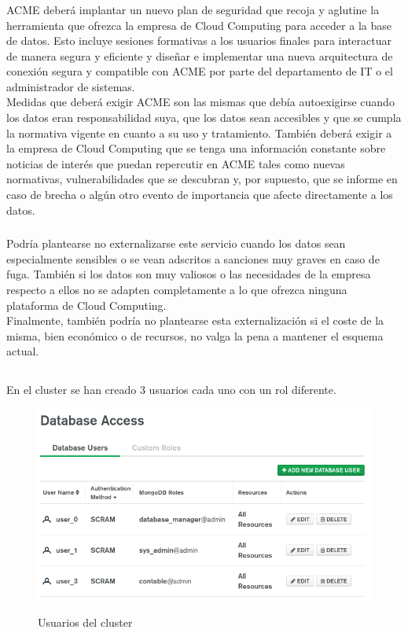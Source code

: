 \documentclass[10pt,a4paper]{article}
\begin{document}
\subsubsection{}
ACME deberá implantar un nuevo plan de seguridad que recoja y aglutine la herramienta que ofrezca la empresa de Cloud Computing para acceder a la base de datos. Esto incluye sesiones formativas a los usuarios finales para interactuar de manera segura y eficiente y diseñar e implementar una nueva arquitectura de conexión segura y compatible con ACME por parte del departamento de IT o el administrador de sistemas.\\
Medidas que deberá exigir ACME son las mismas que debía autoexigirse cuando los datos eran responsabilidad suya, que los datos sean accesibles y que se cumpla la normativa vigente en cuanto a su uso y tratamiento. También deberá exigir a la empresa de Cloud Computing que se tenga una información constante sobre noticias de interés que puedan repercutir en ACME tales como nuevas normativas, vulnerabilidades que se descubran y, por supuesto, que se informe en caso de brecha o algún otro evento de importancia que afecte directamente a los datos.

\subsubsection{}
Podría plantearse no externalizarse este servicio cuando los datos sean especialmente sensibles o se vean adscritos a sanciones muy graves en caso de fuga. También si los datos son muy valiosos o las necesidades de la empresa respecto a ellos no se adapten completamente a lo que ofrezca ninguna plataforma de Cloud Computing.\\
Finalmente, también podría no plantearse esta externalización si el coste de la misma, bien económico o de recursos, no valga la pena a mantener el esquema actual.

\subsection{}

En el cluster se han creado 3 usuarios cada uno con un rol diferente.
\begin{figure}[h!]
  \centering
  \includegraphics[scale=0.5]{cluster.png}\\
  \caption{Usuarios del cluster}
  \label{fig:cluster_users}
\end{figure}
\end{document}
